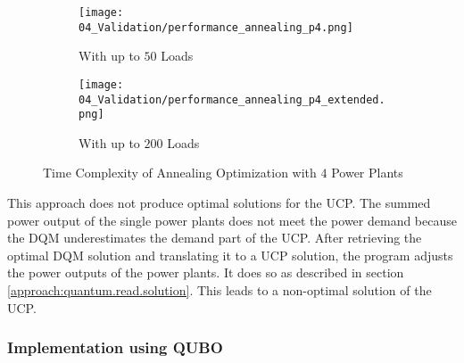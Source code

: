 \begin{figure}
  \begin{subfigure}[b]{0.5 \textwidth}
    \centering
    \texttt{[image: 04\_Validation/performance\_annealing\_p4.png]}
    \caption{With up to $50$ Loads}
    \label{figure:validation.annealing.performance}
  \end{subfigure}
  \begin{subfigure}[b]{0.5 \textwidth}
    \centering
    \texttt{[image: 04\_Validation/performance\_annealing\_p4\_extended.png]}
    \caption{With up to $200$ Loads}
    \label{figure:validation.annealin.performance.extended}
  \end{subfigure}
  \caption{Time Complexity of Annealing Optimization with $4$ Power Plants}
\end{figure}

This approach does not produce optimal solutions for the UCP.
The summed power output of the single power plants does not meet the power demand because the DQM underestimates the demand part of the UCP.
After retrieving the optimal DQM solution and translating it to a UCP solution, the program adjusts the power outputs of the power plants.
It does so as described in section \ref{approach:quantum.read.solution}.
This leads to a non-optimal solution of the UCP.

\subsubsection{Implementation using QUBO}

